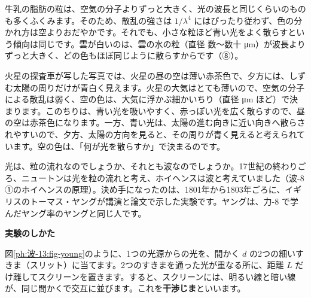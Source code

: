 \begin{seikaku}
牛乳の脂肪の粒は、空気の分子よりずっと大きく、光の波長と同じくらいのものも多くふくみます。そのため、散乱の強さは $1/\lambda^4$ にはぴったり従わず、色の分かれ方は空よりおだやかです。それでも、小さな粒ほど青い光をよく散らすという傾向は同じです。雲が白いのは、雲の水の粒（直径 数〜数十 \unit{\micro m}）が波長よりずっと大きく、どの色もほぼ同じように散らすからです（⑧）。
\end{seikaku}

\begin{motto}[3]
火星の探査車が写した写真では、火星の昼の空は薄い赤茶色で、夕方には、しずむ太陽の周りだけが青白く見えます。火星の大気はとても薄いので、空気の分子による散乱は弱く、空の色は、大気に浮かぶ細かいちり（直径 \unit{\micro m} ほど）で決まります。このちりは、青い光を吸いやすく、赤っぽい光を広く散らすので、昼の空は赤茶色になります。一方、青い光は、太陽の進む向きに近い向きへ散らされやすいので、夕方、太陽の方向を見ると、その周りが青く見えると考えられています。空の色は、「何が光を散らすか」で決まるのです。
\end{motto}



\leavevmode\label{ph:波-13:sec2}光は、粒の流れなのでしょうか、それとも波なのでしょうか。17世紀の終わりごろ、ニュートンは光を粒の流れと考え、ホイヘンスは波と考えていました（波-8 ①のホイヘンスの原理）。決め手になったのは、1801年から1803年ごろに、イギリスのトーマス・ヤングが講演と論文で示した実験です。ヤングは、力-8 で学んだヤング率のヤングと同じ人です。

\noindent\textbf{実験のしかた}\par\nobreak
図\ref{ph:波-13:fig-young}のように、1つの光源からの光を、間かく $d$ の2つの細いすきま（スリット）に当てます。2つのすきまを通った光が重なる所に、距離 $L$ だけ離してスクリーンを置きます。すると、スクリーンには、明るい線と暗い線が、同じ間かくで交互に並びます。これを\textbf{干渉じま}といいます。


